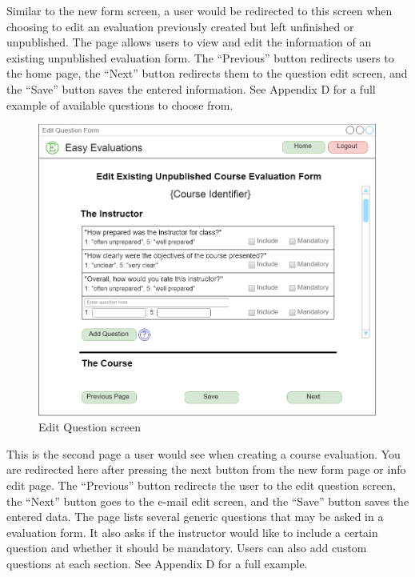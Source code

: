 \documentclass{article}
\begin{document}
Similar to the new form screen, a user would be redirected to this screen when choosing to edit an evaluation previously created but left unfinished or unpublished. The page allows users to view and edit the information of an existing unpublished evaluation form.  The ``Previous'' button redirects users to the home page, the ``Next'' button redirects them to the question edit screen, and the ``Save'' button saves the entered information. See Appendix D for a full example of available questions to choose from.

\newpage

\begin{center}
\begin{figure}[H]
    \centering
    \caption{Edit Question screen}
    \includegraphics[width=6.5in]{images/questions_screen.png}
\end{figure}
\end{center}

This is the second page a user would see when creating a course evaluation. You are redirected here after pressing the next button from the new form page or info edit page.  The ``Previous'' button redirects the user to the edit question screen, the ``Next'' button goes to the e-mail edit screen, and the ``Save'' button saves the entered data. The page lists several generic questions that may be asked in a evaluation form. It also asks if the instructor would like to include a certain question and whether it should be mandatory. Users can also add custom questions at each section. See Appendix D for a full example.
\end{document}
